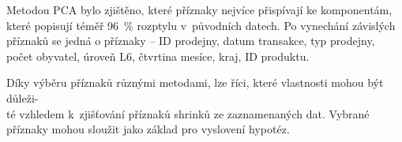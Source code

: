 Metodou PCA bylo zjištěno, které příznaky nejvíce přispívají ke komponentám, které popisují téměř 96~\% rozptylu v~původních datech. Po vynechání závislých příznaků se jedná o příznaky -- ID prodejny, datum transakce, typ prodejny, počet obyvatel, úroveň L6, čtvrtina mesíce, kraj, ID produktu. 


Díky výběru příznaků různými metodami, lze říci, které vlastnosti mohou být důleži-\\té vzhledem k~zjišťování příznaků shrinků ze zaznamenaných dat. Vybrané příznaky mohou sloužit jako základ pro vyslovení hypotéz.

    


